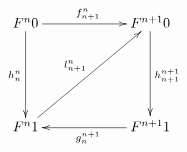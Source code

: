 \documentclass[12pt]{article}
\begin{document}
\pagestyle{empty}

\begin{align*}
  \vcenter{
    \xymatrix@=60pt{
      F^n 0
      \ar@{->}[r]^{f^n_{n + 1}}
      \ar@{->}[d]_{h^n_n}
      &
      F^{n + 1} 0
      \ar@{->}[d]^{h^{n + 1}_{n + 1}}
      \\
      F^n 1
      \ar@{->}[ru]^{l^n_{n + 1}}
      &
      F^{n + 1} 1
      \ar@{->}[l]^{g^{n + 1}_n}
    }
  }
\end{align*}
\end{document}
